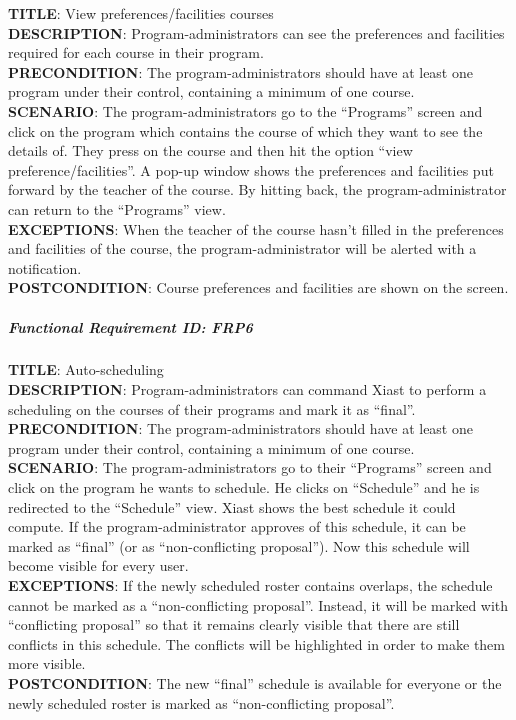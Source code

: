 \documentclass[12pt]{article}
\begin{document}
\textbf{TITLE}: View preferences/facilities
courses\\\textbf{DESCRIPTION}: Program-administrators can see the
preferences and facilities required for each course in their
program.\\\textbf{PRECONDITION}: The program-administrators should have
at least one program under their control, containing a minimum of one
course.\\\textbf{SCENARIO}: The program-administrators go to the
``Programs'' screen and click on the program which contains the course
of which they want to see the details of. They press on the course and
then hit the option ``view preference/facilities''. A pop-up window
shows the preferences and facilities put forward by the teacher of the
course. By hitting back, the program-administrator can return to the
``Programs'' view.\\\textbf{EXCEPTIONS}: When the teacher of the course
hasn't filled in the preferences and facilities of the course, the
program-administrator will be alerted with a
notification.\\\textbf{POSTCONDITION}: Course preferences and facilities
are shown on the screen.

\subparagraph{Functional Requirement \textbf{ID}:
FRP6}\label{functional-requirement-id-frp6}

\textbf{TITLE}: Auto-scheduling\\\textbf{DESCRIPTION}:
Program-administrators can command Xiast to perform a scheduling on the
courses of their programs and mark it as
``final''.\\\textbf{PRECONDITION}: The program-administrators should
have at least one program under their control, containing a minimum of
one course.\\\textbf{SCENARIO}: The program-administrators go to their
``Programs'' screen and click on the program he wants to schedule. He
clicks on ``Schedule'' and he is redirected to the ``Schedule'' view.
Xiast shows the best schedule it could compute. If the
program-administrator approves of this schedule, it can be marked as
``final'' (or as ``non-conflicting proposal''). Now this schedule will
become visible for every user.\\\textbf{EXCEPTIONS}: If the newly
scheduled roster contains overlaps, the schedule cannot be marked as a
``non-conflicting proposal''. Instead, it will be marked with
``conflicting proposal'' so that it remains clearly visible that there
are still conflicts in this schedule. The conflicts will be highlighted
in order to make them more visible.\\\textbf{POSTCONDITION}: The new
``final'' schedule is available for everyone or the newly scheduled
roster is marked as ``non-conflicting proposal''.
\end{document}
